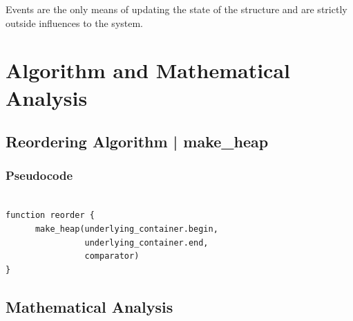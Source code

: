 \documentclass{article}
\begin{document}
Events are the only means of updating the state of the structure and are strictly outside influences to the system.

\newpage

\section{Algorithm and Mathematical Analysis}

\subsection{Reordering Algorithm | make_heap}

\subsubsection{Pseudocode}

\begin{verbatim}

function reorder {
      make_heap(underlying_container.begin, 
                underlying_container.end,
                comparator)
}
\end{verbatim}

\subsection{Mathematical Analysis}
\end{document}
